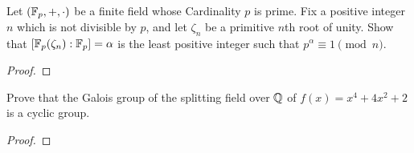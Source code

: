 \begin{problem}
Let $(\mathbb{F}_p,+,\cdot)$ be a finite field whose Cardinality $p$ is
prime. Fix a positive integer $n$ which is not divisible by $p$, and let
$\zeta_n$ be a primitive $n$th root of unity. Show that
$\left[\mathbb{F}_p(\zeta_n):\mathbb{F}_p\right]=\alpha$  is the least positive integer
such that $p^\alpha\equiv 1\pmod{n}$.
\end{problem}
\begin{proof}
\end{proof}

\begin{problem}
Prove that the Galois group of the splitting field over $\mathbb{Q}$ of
$f(x)=x^4+4x^2+2$ is a cyclic group.
\end{problem}
\begin{proof}
\end{proof}


